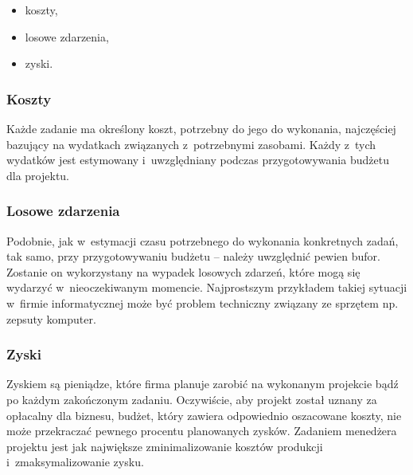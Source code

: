 \documentclass[oneside,polski,logo]{amuthesis}
\begin{document}
\begin{itemize}
	\item koszty,
	\item losowe zdarzenia,
	\item zyski.
\end{itemize}

\subsubsection {Koszty}
Każde zadanie ma określony koszt, potrzebny do jego do wykonania, najczęściej bazujący na wydatkach związanych z~potrzebnymi zasobami. Każdy z~tych wydatków jest estymowany i~uwzględniany podczas przygotowywania budżetu dla projektu.

\subsubsection {Losowe zdarzenia}
Podobnie, jak w~estymacji czasu potrzebnego do wykonania konkretnych zadań, tak samo, przy przygotowywaniu budżetu – należy uwzględnić pewien bufor. Zostanie on wykorzystany na wypadek losowych zdarzeń, które mogą się wydarzyć w~nieoczekiwanym momencie. Najprostszym przykładem takiej sytuacji w~firmie informatycznej może być problem techniczny związany ze sprzętem np. zepsuty komputer.

\subsubsection {Zyski}
Zyskiem są pieniądze, które firma planuje zarobić na wykonanym projekcie bądź po każdym zakończonym zadaniu. Oczywiście, aby projekt został uznany za opłacalny dla biznesu, budżet, który zawiera odpowiednio oszacowane koszty, nie może przekraczać pewnego procentu planowanych zysków. Zadaniem menedżera projektu jest jak największe zminimalizowanie kosztów produkcji i~zmaksymalizowanie zysku.
\end{document}

